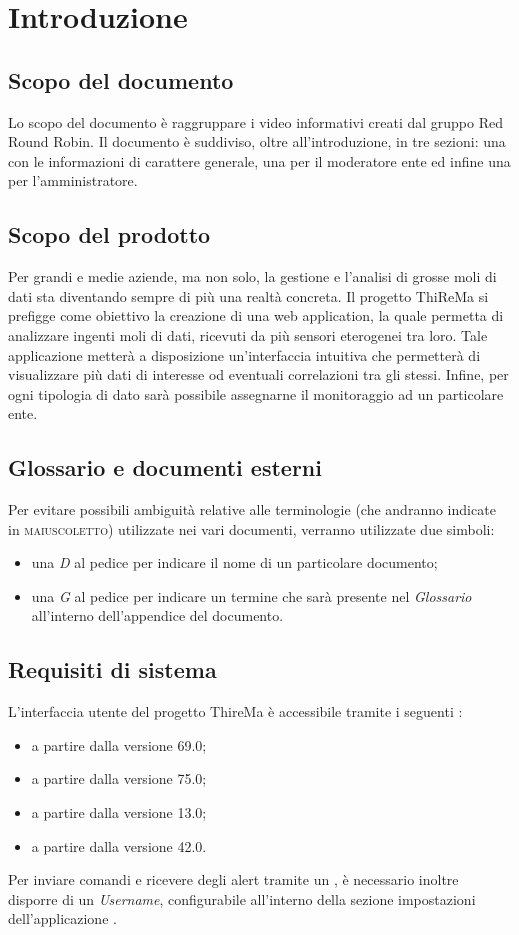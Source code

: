 \section{Introduzione}
	\subsection{Scopo del documento}
		Lo scopo del documento è raggruppare i video informativi creati dal gruppo Red Round Robin. Il documento è suddiviso, oltre all'introduzione, in tre sezioni: una con le informazioni di carattere generale, una per il moderatore ente ed infine una per l'amministratore.	
	\subsection{Scopo del prodotto}
		Per grandi e medie aziende, ma non solo, la gestione e l'analisi di grosse moli di dati sta diventando sempre di più una realtà concreta.
	 	\newline
		Il progetto ThiReMa si prefigge come obiettivo la creazione di una web application, la quale permetta di analizzare ingenti moli di dati, ricevuti da più sensori eterogenei tra loro. Tale applicazione metterà a disposizione un'interfaccia intuitiva che permetterà di visualizzare più dati di interesse od eventuali correlazioni tra gli stessi. Infine, per ogni tipologia di dato sarà possibile assegnarne il monitoraggio ad un particolare ente.	
	\subsection{Glossario e documenti esterni}
		Per evitare possibili ambiguità relative alle terminologie (che andranno indicate in \textsc{maiuscoletto}) utilizzate nei vari documenti, verranno utilizzate due simboli:
		\begin{itemize}
			\item una \textit{D} al pedice per indicare il nome di un particolare documento;
			\item una \textit{G} al pedice per indicare un termine che sarà presente nel \textit{Glossario} all'interno dell'appendice del documento.
		\end{itemize}
	\subsection{Requisiti di sistema}
		L'interfaccia utente del progetto ThireMa è accessibile tramite i seguenti :
		\begin{itemize}
		 	\item {} a partire dalla versione 69.0;
		 	\item {} a partire dalla versione 75.0;
		 	\item {} a partire dalla versione 13.0;
		 	\item {} a partire dalla versione 42.0.
		\end{itemize} 
		Per inviare comandi e ricevere degli alert tramite un , è necessario inoltre disporre di un \textit{Username}, configurabile all'interno della sezione impostazioni dell'applicazione .
